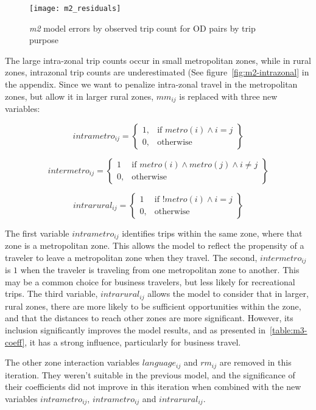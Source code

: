 \begin{figure}[H]
\centering
\texttt{[image: m2\_residuals]}
\caption{\textit{m2} model errors by observed trip count for OD pairs by trip purpose}
\label{fig:m2-residuals}
\end{figure}

The large intra-zonal trip counts occur in small metropolitan zones, while in rural zones, intrazonal trip counts are underestimated (See figure~\ref{fig:m2-intrazonal} in the appendix. Since we want to penalize intra-zonal travel in the metropolitan zones, but allow it in larger rural zones, $mm_{ij}$  is replaced with three new variables:

	$$	
	intrametro_{ij} = \left.
  \begin{cases}
    1, & \text{if } metro(i) \wedge i = j \\
    0, & \text{otherwise }
  \end{cases}
  \right\}
	$$
  
	$$	
	intermetro_{ij} = \left.
  \begin{cases}
    1 & \text{if } metro(i) \wedge metro(j) \wedge i \neq j \\
    0, & \text{otherwise } 
  \end{cases}
  \right\}
	$$  
	
	$$	
	intrarural_{ij} = \left.
  \begin{cases}
    1 & \text{if } !metro(i) \wedge i = j \\
    0, & \text{otherwise } 
  \end{cases}
  \right\}
	$$

The first variable $intrametro_{ij}$ identifies trips within the same zone, where that zone is a metropolitan zone. This allows the model to reflect the propensity of a traveler to leave a metropolitan zone when they travel. The second, $intermetro_{ij}$ is $1$ when the traveler is traveling from one metropolitan zone to another. This may be a common choice for business travelers, but less likely for recreational trips. The third variable, $intrarural_{ij}$ allows the model to consider that in larger, rural zones, there are more likely to be sufficient opportunities within the zone, and that the distances to reach other zones are more significant. However, its inclusion significantly improves the model results, and as presented in~\ref{table:m3-coeff}, it has a strong influence, particularly for business travel.

The other zone interaction variables $language_{ij}$  and $rm_{ij}$  are removed in this iteration. They weren't suitable in the previous model, and the significance of their coefficients did not improve in this iteration when combined with the new variables $intrametro_{ij}$,  $intrametro_{ij}$ and $intrarural_{ij}$.


